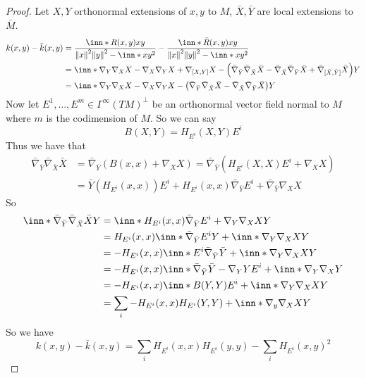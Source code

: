 \documentclass[a4paper]{article}
\begin{document}
\begin{proof}
  Let $X,Y$ orthonormal extensions of $x,y$ to  $M$, $\bar{X}, \bar{Y}$ are local extensions to $\bar{M}$. 
  \[
    \begin{aligned}
      k(x,y) - \bar{k}(x,y) &= \frac{\inn*{R(x,y)x}{y}}{\norm{x}^2\norm{y}^2 - \inn*{x}{y}^2} - \frac{\inn*{\bar{R}(x,y)x}{y}}{\norm{x}^2 \norm{y}^2 - \inn*{x}{y}^2} \\
                            &= \inn*{\nabla_Y \nabla_X X - \nabla_X \nabla_Y X + \nabla_{[X,Y]}X - \left(\bar{\nabla}_{\bar{Y}} \bar{\nabla}_{\bar{X}} \bar{X} - \bar{\nabla}_{\bar{X}}\bar{\nabla}_{\bar{Y}}\bar{X} + \bar{\nabla}_{[\bar{X},\bar{Y}]} \bar{X} \right)}{Y} \\
                            &= \inn*{\nabla_Y \nabla_X X - \nabla_X \nabla_Y X - \left(\bar{\nabla}_{\bar{Y}} \bar{\nabla}_{\bar{X}} \bar{X} - \bar{\nabla}_{\bar{X}}\bar{\nabla}_{\bar{Y}}\bar{X}\right)}{Y} \\
    \end{aligned}
  \]
  Now let $E^1, \dots, E^m \in \Gamma^{\infty}(TM)^\perp$ be an orthonormal vector field normal to $M$ where $m$ is the codimension of $M$. So we can say
  \[
    B(X,Y) = H_{E^i}  \left( X,Y \right) E^i
  \]
  Thus we have that
  \[
    \begin{aligned}
      \bar{\nabla}_{\bar{Y}} \bar{\nabla}_{\bar{X}} \bar{X} &= \bar{\nabla}_{\bar{Y}} \left( B(x,x) + \nabla_X X\right) = \bar{\nabla}_{\bar{Y}} \left( H_{E^i}(X,X)E^i + \nabla_X X \right)  \\
                                                            &= \bar{Y} \left( H_{E^i}(x,x) \right) E^i + H_{E^i}(x,x) \bar{\nabla}_{\bar{Y}} E^i + \bar{\nabla}_{\bar{Y}} \nabla_X X
    \end{aligned}
  \]
  So 
  \[
    \begin{aligned}
      \inn*{\bar{\nabla}_{\bar{Y}} \bar{\nabla}_{\bar{X}} \bar{X}}{Y} &= \inn*{H_{E^i}(x,x) \bar{\nabla}_{\bar{Y}} E^i + \nabla_Y \nabla_X X}{Y} \\
                                                                      &= H_{E^i}(x,x) \inn*{\bar{\nabla}_{\bar{Y}}E^i}{Y} + \inn*{\nabla_Y \nabla_X X}{Y} \\
                                                                      &= -H_{E^i}(x,x) \inn*{E^i}{\bar{\nabla}_{\bar{Y}} \bar{Y}} + \inn*{\nabla_Y \nabla_X X}{Y} \\
                                                                      &= -H_{E^i}(x,x) \inn*{\bar{\nabla}_{\bar{Y}} \bar{Y} - \nabla_Y Y}{E^i} + \inn*{\nabla_Y \nabla_X}{Y} \\
                                                                      &= -H_{E^i}(x,x) \inn*{B(Y,Y)}{E^i} + \inn*{\nabla_Y \nabla_X X}{Y} \\
                                                                      &= \sum_i -H_{E^i}(x,x) H_{E^i}(Y,Y) + \inn*{\nabla_y \nabla_X X}{Y} \\
    \end{aligned}
  \]
  So we have
  \[
    k(x,y) - \bar{k}(x,y) = \sum_i H_{E^i}(x,x) H_{E^i}(y,y) - \sum_i H_{E^i}(x,y)^2
  \]
\end{proof}
\end{document}

